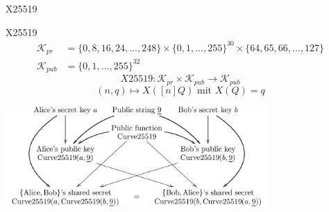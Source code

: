 \begin{frame}{X25519}

    \begin{definitionblock}{X25519}\\
        \vspace{-2em}
        \begin{align*}
            \mathcal{K}_{pr} &= \{0,8,16,24,\dots,248\} \times \{0,1,\dots,255\}^{30} \times \{64,65,66,\dots,127\} \\
            \mathcal{K}_{pub} &= \{0,1,\dots,255\}^{32}
        \end{align*}
        \vspace{-2em}
        \[X25519: \mathcal{K}_{pr} \times \mathcal{K}_{pub} \longrightarrow \mathcal{K}_{pub}\]
        \[(n,q)\longmapsto X([n]Q)\text{ mit $X(Q)=q$}\]
    \end{definitionblock}
    \begin{center}
        \includegraphics[width=10cm]{tex/img/d-h.png}
    \end{center}
        
\end{frame}